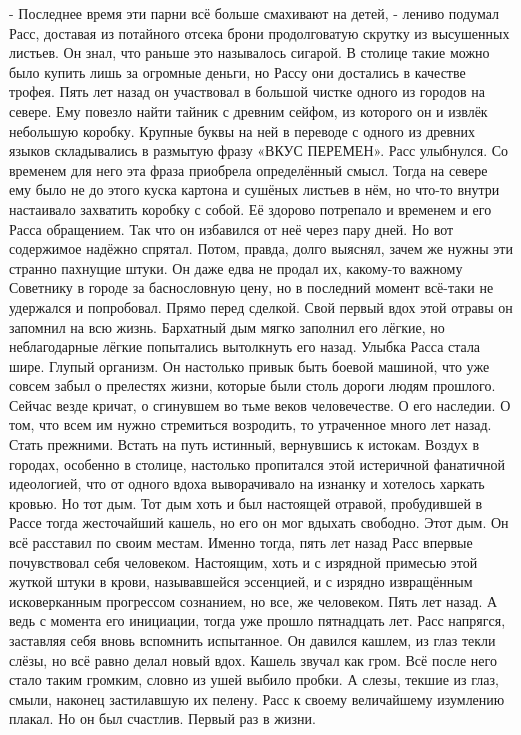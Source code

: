 \documentclass[a4paper, 12pt]{report}
\begin{document}
- Последнее время эти парни всё больше смахивают на детей, - лениво подумал Расс, доставая из потайного отсека брони продолговатую скрутку из высушенных листьев. Он знал, что раньше это называлось сигарой. В столице такие можно было купить лишь за огромные деньги, но Рассу они достались в качестве трофея. Пять лет назад он участвовал в большой чистке одного из городов на севере. Ему повезло найти тайник с древним сейфом, из которого он и извлёк небольшую коробку. Крупные буквы на ней в переводе с одного из древних языков складывались в размытую фразу «ВКУС ПЕРЕМЕН». Расс улыбнулся. Со временем для него эта фраза приобрела определённый смысл. Тогда на севере ему было не до этого куска картона и сушёных листьев в нём, но что-то внутри настаивало захватить коробку с собой. Её здорово потрепало и временем и его Расса обращением. Так что он избавился от неё через пару дней. Но вот содержимое надёжно спрятал. Потом, правда, долго выяснял, зачем же нужны эти странно пахнущие штуки. Он даже едва не продал их, какому-то важному Советнику в городе за баснословную цену, но в последний момент всё-таки не удержался и попробовал. Прямо перед сделкой. 
Свой первый вдох этой отравы он запомнил на всю жизнь. Бархатный дым мягко заполнил его лёгкие, но неблагодарные лёгкие попытались вытолкнуть его назад. Улыбка Расса стала шире. Глупый организм. Он настолько привык быть боевой машиной, что уже совсем забыл о прелестях жизни, которые были столь дороги людям прошлого. Сейчас везде кричат, о сгинувшем во тьме веков человечестве. О его наследии. О том, что всем им нужно стремиться возродить, то утраченное много лет назад. Стать прежними. Встать на путь истинный, вернувшись к истокам. Воздух в городах, особенно в столице, настолько пропитался этой истеричной фанатичной идеологией, что от одного вдоха выворачивало на изнанку и хотелось харкать кровью. Но тот дым. Тот дым хоть и был настоящей отравой, пробудившей в Рассе тогда жесточайший кашель, но его он мог вдыхать свободно. Этот дым. Он всё расставил по своим местам. Именно тогда, пять лет назад Расс впервые почувствовал себя человеком. Настоящим, хоть и с изрядной примесью этой жуткой штуки в крови, называвшейся эссенцией, и с изрядно извращённым исковерканным прогрессом сознанием, но все, же человеком. Пять лет назад. А ведь с момента его инициации, тогда уже прошло пятнадцать лет. Расс напрягся, заставляя себя вновь вспомнить испытанное. 
Он давился кашлем, из глаз текли слёзы, но всё равно делал новый вдох. Кашель звучал как гром. Всё после него стало таким громким, словно из ушей выбило пробки. А слезы, текшие из глаз, смыли, наконец застилавшую их пелену. Расс к своему величайшему изумлению плакал. Но он был счастлив. Первый раз в жизни.
\end{document}
